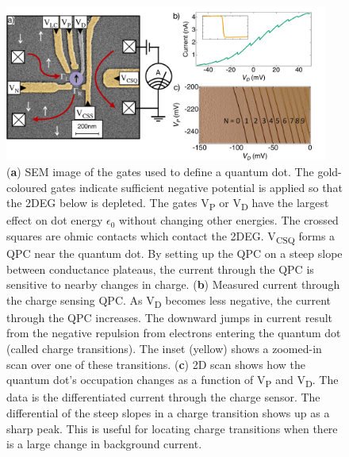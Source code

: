 \begin{figure}[!htb]
 \begin{center}
 \includegraphics[width=0.95\textwidth]{figures/ch1/figure6.pdf}
 \caption[Charge Sensing a Quantum Dot]{\label{fig:ch1/ct_intro} 
 (\textbf{a}) SEM image of the gates used to define a quantum dot. The gold-coloured gates indicate sufficient negative potential is applied so that the 2DEG below is depleted. The gates V\textsubscript{P} or V\textsubscript{D} have the largest effect on dot energy $\epsilon_0$ without changing other energies. The crossed squares are ohmic contacts which contact the 2DEG. V\textsubscript{CSQ} forms a QPC near the quantum dot. By setting up the QPC on a steep slope between conductance plateaus, the current through the QPC is sensitive to nearby changes in charge. (\textbf{b}) Measured current through the charge sensing QPC. As V\textsubscript{D} becomes less negative, the current through the QPC increases. The downward jumps in current result from the negative repulsion from electrons entering the quantum dot (called charge transitions). The inset (yellow) shows a zoomed-in scan over one of these transitions. (\textbf{c}) 2D scan shows how the quantum dot's occupation changes as a function of V\textsubscript{P} and V\textsubscript{D}. The data is the differentiated current through the charge sensor. The differential of the steep slopes in a charge transition shows up as a sharp peak. This is useful for locating charge transitions when there is a large change in background current. 
 }
 \end{center}
\end{figure}


